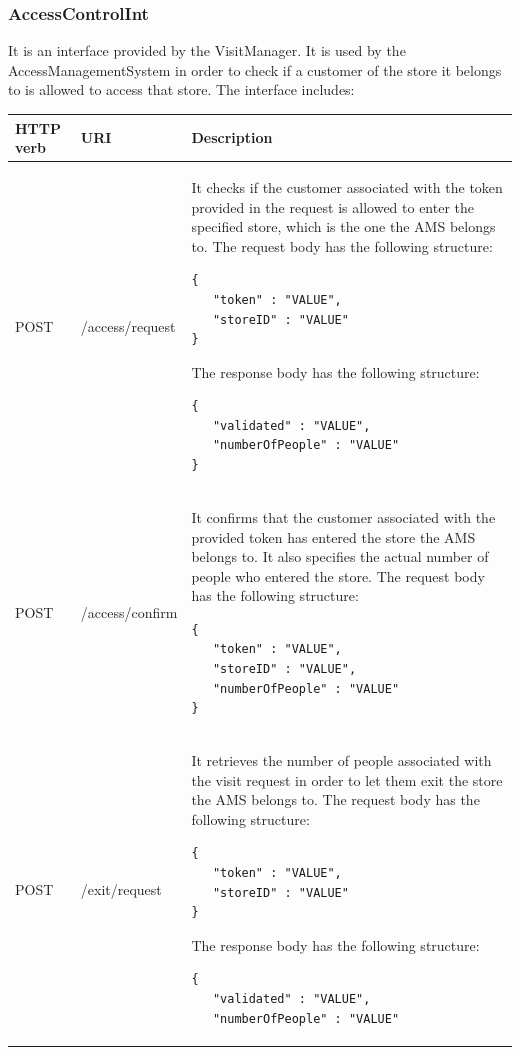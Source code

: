 \documentclass[a4paper,oneside,11pt]{book}
\begin{document}
    \subsubsection{AccessControlInt}
    It is an interface provided by the VisitManager. It is used by the AccessManagementSystem in order to check if a customer of the store it belongs to is allowed to access that store. The interface includes:
    \begin{longtable}[c] { |>{\centering\arraybackslash}H{0.11\textwidth}|>{\centering\arraybackslash\ttfamily}P{0.23\textwidth}|H{0.50\textwidth}| }
        \hline
        \textbf{HTTP verb} & \textrm{\textbf{URI}} & \textbf{\textbf{Description}} \\ \hline
        POST & /access/request & It checks if the customer associated with the token provided in the request is allowed to enter the specified store, which is the one the AMS belongs to. The request body has the following structure:
        \begin{lstlisting}[language=jsonDD]
{
   "token" : "VALUE",
   "storeID" : "VALUE"
}
        \end{lstlisting}
        The response body has the following structure:
        \begin{lstlisting}[language=jsonDD]
{
   "validated" : "VALUE",
   "numberOfPeople" : "VALUE"
}
        \end{lstlisting}
        \\ \hline
        POST & /access/confirm & It confirms that the customer associated with the provided token has entered the store the AMS belongs to. It also specifies the actual number of people who entered the store. The request body has the following structure:
        \begin{lstlisting}[language=jsonDD]
{
   "token" : "VALUE",
   "storeID" : "VALUE",
   "numberOfPeople" : "VALUE"
}
        \end{lstlisting} \\ \hline
        POST & /exit/request & It retrieves the number of people associated with the visit request in order to let them exit the store the AMS belongs to. The request body has the following structure:
        \begin{lstlisting}[language=jsonDD]
{
   "token" : "VALUE",
   "storeID" : "VALUE"
}
        \end{lstlisting}
        The response body has the following structure:
        \begin{lstlisting}[language=jsonDD]
{
   "validated" : "VALUE",
   "numberOfPeople" : "VALUE"

\end{lstlisting}
\end{longtable}
\end{document}
